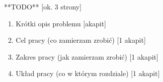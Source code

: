 

**TODO** [ok. 3 strony]

\begin{enumerate}
    \item Krótki opis problemu [akapit]
    \item Cel pracy (co zamierzam zrobić) [1 akapit]
    \item Zakres pracy (jak zamierzam zrobić) [1 akapit]
    \item Układ pracy (co w którym rozdziale) [1 akapit]
\end{enumerate}




